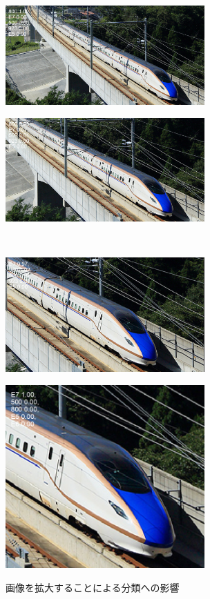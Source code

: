 \begin{figure}[htbp]
	\begin{minipage}[b]{.5\linewidth}
		\includegraphics[width=3in]{fig/E7/E7_0000.png}
		\label{PIC1}
	\end{minipage}%
	\begin{minipage}[b]{.5\linewidth}
		\includegraphics[width=3in]{fig/E7/E7_0000-1.png}
		\label{PIC2}
	\end{minipage}%
	\\ %
	\begin{minipage}[b]{.5\linewidth}
		\includegraphics[width=3in]{fig/E7/E7_0000-2.png}
		\label{PIC3.jpg}
	\end{minipage}%
	\begin{minipage}[b]{.5\linewidth}
		\includegraphics[width=3in]{fig/E7/E7_0000-3.png}
		\label{PIC4}
	\end{minipage}%

	\caption{画像を拡大することによる分類への影響}\label{DENSHA}
\end{figure}


